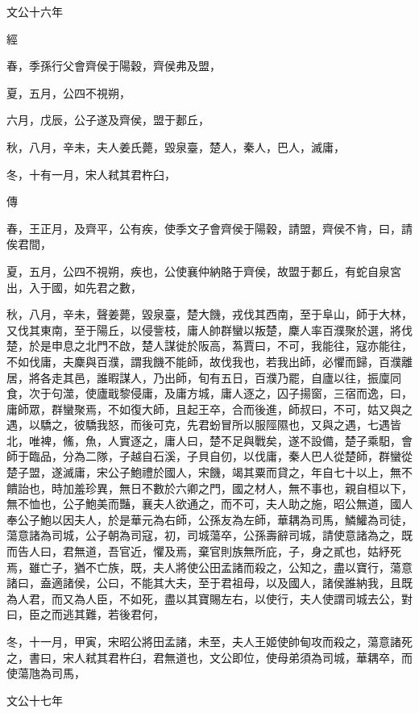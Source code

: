\documentclass[fontset = none]{ctexart}
\begin{document}
文公十六年


經



春，季孫行父會齊侯于陽穀，齊侯弗及盟，

夏，五月，公四不視朔，

六月，戊辰，公子遂及齊侯，盟于郪丘，

秋，八月，辛未，夫人姜氏薨，毀泉臺，楚人，秦人，巴人，滅庸，

冬，十有一月，宋人弒其君杵臼，

傳



春，王正月，及齊平，公有疾，使季文子會齊侯于陽穀，請盟，齊侯不肯，曰，請俟君間，

夏，五月，公四不視朔，疾也，公使襄仲納賂于齊侯，故盟于郪丘，有蛇自泉宮出，入于國，如先君之數，

秋，八月，辛未，聲姜薨，毀泉臺，楚大饑，戎伐其西南，至于阜山，師于大林，又伐其東南，至于陽丘，以侵訾枝，庸人帥群蠻以叛楚，麇人率百濮聚於選，將伐楚，於是申息之北門不啟，楚人謀徙於阪高，蒍賈曰，不可，我能往，寇亦能往，不如伐庸，夫麇與百濮，謂我饑不能師，故伐我也，若我出師，必懼而歸，百濮離居，將各走其邑，誰暇謀人，乃出師，旬有五日，百濮乃罷，自廬以往，振廩同食，次于句澨，使廬戢黎侵庸，及庸方城，庸人逐之，囚子揚窗，三宿而逸，曰，庸師眾，群蠻聚焉，不如復大師，且起王卒，合而後進，師叔曰，不可，姑又與之遇，以驕之，彼驕我怒，而後可克，先君蚡冒所以服陘隰也，又與之遇，七遇皆北，唯裨，鯈，魚，人實逐之，庸人曰，楚不足與戰矣，遂不設備，楚子乘馹，會師于臨品，分為二隊，子越自石溪，子貝自仞，以伐庸，秦人巴人從楚師，群蠻從楚子盟，遂滅庸，宋公子鮑禮於國人，宋饑，竭其粟而貸之，年自七十以上，無不饋詒也，時加羞珍異，無日不數於六卿之門，國之材人，無不事也，親自桓以下，無不恤也，公子鮑美而豔，襄夫人欲通之，而不可，夫人助之施，昭公無道，國人奉公子鮑以因夫人，於是華元為右師，公孫友為左師，華耦為司馬，鱗鱹為司徒，蕩意諸為司城，公子朝為司寇，初，司城蕩卒，公孫壽辭司城，請使意諸為之，既而告人曰，君無道，吾官近，懼及焉，棄官則族無所庇，子，身之貳也，姑紓死焉，雖亡子，猶不亡族，既，夫人將使公田孟諸而殺之，公知之，盡以寶行，蕩意諸曰，盍適諸侯，公曰，不能其大夫，至于君祖母，以及國人，諸侯誰納我，且既為人君，而又為人臣，不如死，盡以其寶賜左右，以使行，夫人使謂司城去公，對曰，臣之而逃其難，若後君何，

冬，十一月，甲寅，宋昭公將田孟諸，未至，夫人王姬使帥甸攻而殺之，蕩意諸死之，書曰，宋人弒其君杵臼，君無道也，文公即位，使母弟須為司城，華耦卒，而使蕩虺為司馬，





文公十七年
\end{document}

